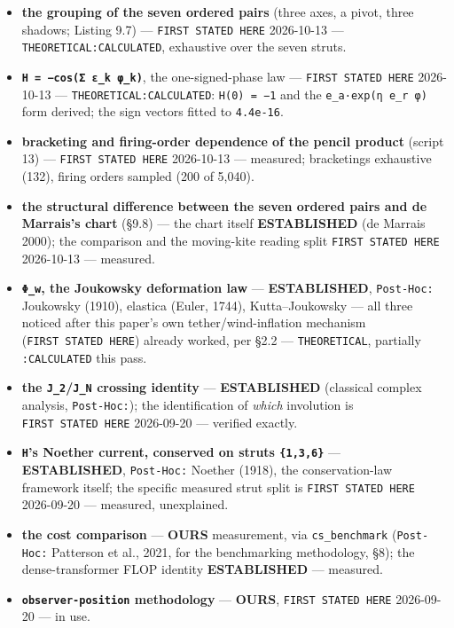 \documentclass[
  10pt,
]{article}
\begin{document}
\begin{itemize}
  of the 168 that are automorphisms with \textbf{all signs +1} (pure
  relabelling); element orders \texttt{1×1,\ 3×14,\ 7×6} (the Frobenius
  group \texttt{7:3}); a web search over the de Marrais papers'
  abstracts and listings surfaced no 21-element subgroup (the papers
  were not read in full), so the name is treated as this project's.
\item
  \textbf{the grouping of the seven ordered pairs} (three axes, a pivot,
  three shadows; Listing 9.7) --- \texttt{FIRST\ STATED\ HERE}
  2026-10-13 --- \texttt{THEORETICAL:CALCULATED}, exhaustive over the
  seven struts.
\item
  \textbf{\texttt{H\ =\ −cos(Σ\ ε\_k\ φ\_k)}}, the one-signed-phase law
  --- \texttt{FIRST\ STATED\ HERE} 2026-10-13 ---
  \texttt{THEORETICAL:CALCULATED}: \texttt{H(0)\ =\ −1} and the
  \texttt{e\_a·exp(η\ e\_r\ φ)} form derived; the sign vectors fitted to
  \texttt{4.4e-16}.
\item
  \textbf{bracketing and firing-order dependence of the pencil product}
  (script 13) --- \texttt{FIRST\ STATED\ HERE} 2026-10-13 --- measured;
  bracketings exhaustive (132), firing orders sampled (200 of 5,040).
\item
  \textbf{the structural difference between the seven ordered pairs and
  de Marrais's chart} (§9.8) --- the chart itself \textbf{ESTABLISHED}
  (de Marrais 2000); the comparison and the moving-kite reading split
  \texttt{FIRST\ STATED\ HERE} 2026-10-13 --- measured.
\item
  \textbf{\texttt{Φ\_w}, the Joukowsky deformation law} ---
  \textbf{ESTABLISHED}, \texttt{Post-Hoc:} Joukowsky (1910), elastica
  (Euler, 1744), Kutta--Joukowsky --- all three noticed after this
  paper's own tether/wind-inflation mechanism
  (\texttt{FIRST\ STATED\ HERE}) already worked, per §2.2 ---
  \texttt{THEORETICAL}, partially \texttt{:CALCULATED} this pass.
\item
  \textbf{the \texttt{J\_2}/\texttt{J\_N} crossing identity} ---
  \textbf{ESTABLISHED} (classical complex analysis, \texttt{Post-Hoc:});
  the identification of \emph{which} involution is
  \texttt{FIRST\ STATED\ HERE} 2026-09-20 --- verified exactly.
\item
  \textbf{\texttt{H}'s Noether current, conserved on struts
  \texttt{\{1,3,6\}}} --- \textbf{ESTABLISHED}, \texttt{Post-Hoc:}
  Noether (1918), the conservation-law framework itself; the specific
  measured strut split is \texttt{FIRST\ STATED\ HERE} 2026-09-20 ---
  measured, unexplained.
\item
  \textbf{the cost comparison} --- \textbf{OURS} measurement, via
  \texttt{cs\_benchmark} (\texttt{Post-Hoc:} Patterson et al., 2021, for
  the benchmarking methodology, §8); the dense-transformer FLOP identity
  \textbf{ESTABLISHED} --- measured.
\item
  \textbf{\texttt{observer-position} methodology} --- \textbf{OURS},
  \texttt{FIRST\ STATED\ HERE} 2026-09-20 --- in use.
\end{itemize}
\end{document}
